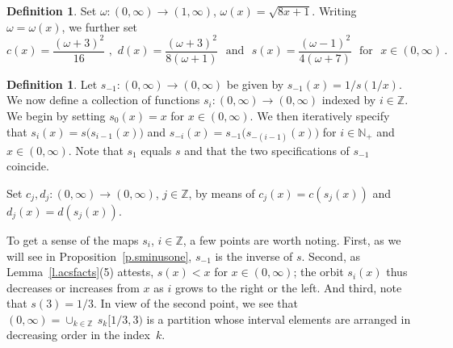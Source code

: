 \documentclass[letterpaper,11pt,oneside,reqno]{amsbook}
\newcommand{\N}{\ensuremath{\mathbb{N}}}
\newcommand{\Z}{\ensuremath{\mathbb{Z}}}
\numberwithin{figure}{chapter}
\theoremstyle{definition}
\theoremstyle{definition}
\theoremstyle{definition}
\newtheorem{definition}[theorem]{Definition}
\theoremstyle{definition}
\theoremstyle{definition}
\newcommand{\nwithoutzero}{\N_+}
\newcommand{\macsee}{c}
\newcommand{\macomega}{\omega}
\newcommand{\macdee}{d}
\def\hfff#1{\label{#1}}
\begin{document}
\begin{definition}\label{d.acs}\hfff{smap}
Set $\macomega:(0,\infty) \to (1,\infty)$, $\macomega(x) = \sqrt{8x+1}$. Writing $\omega = \omega(x)$, we further set
$$
\macsee(x)   =    \frac{(\macomega + 3)^2}{16} \, \, , \, \,
\macdee(x)  =  \frac{(\macomega + 3)^2}{8(\macomega + 1)} \, \, \, \, \textrm{and} \,\, \, \, s(x)  =  \frac{(\macomega - 1)^2}{4(\macomega + 7)} \,\,\,\, \textrm{for} \, \, \, \, x \in (0,\infty) \, .
$$
\end{definition}
\begin{definition}\label{d.stabc}
Let $s_{-1}:(0,\infty) \to (0,\infty)$ be given by $s_{-1}(x) = 1/s(1/x)$. 
We now define a collection of functions $s_i:(0,\infty) \to (0,\infty)$ indexed by $i \in \Z$. We begin by setting $s_0(x) = x$ for $x \in (0,\infty)$. 
We then iteratively specify that $s_i(x) = s \big( s_{i-1}(x) \big)$ and  $s_{-i}(x) = s_{-1} \big( s_{-(i-1)}(x) \big)$ 
for $i \in \nwithoutzero$ and $x \in (0,\infty)$. Note that $s_1$ equals $s$ and that the two specifications of $s_{-1}$ coincide. 

Set $\macsee_j,\macdee_j:(0,\infty) \to (0,\infty)$, $j \in \Z$, by means of $\macsee_j(x) =  \macsee (s_j(x))$ and  $\macdee_j(x) =  \macdee (s_j(x))$.
\end{definition}
To get a sense of the maps $s_i$, $i \in \Z$, a few points are worth noting. First, as we will see in Proposition~\ref{p.sminusone}, $s_{-1}$ is the inverse of $s$. Second,
as Lemma~\ref{l.acsfacts}(5) attests, $s(x) < x$ for $x \in (0,\infty)$; the orbit $s_i(x)$ thus decreases or increases from $x$ as $i$ grows to the right or the left.
And third, note that $s(3) = 1/3$. In view of the second point, we see that $(0,\infty) = \cup_{k \in \Z} \, s_k [1/3,3)$ is a partition whose interval elements are arranged in decreasing order in the index~$k$.
\end{document}
